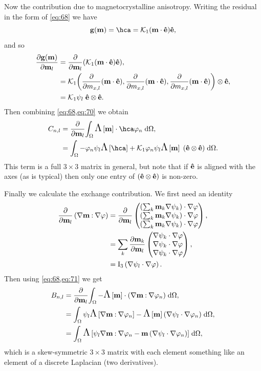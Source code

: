 Now the contribution due to magnetocrystalline anisotropy.
Writing the residual in the form of \cref{eq:68} we have 
\begin{equation}
  \gv(\mv) = \hca = \kone (\mv \cdot \ev) \ev,  
\end{equation}
and so 
\begin{equation}
  \begin{aligned}
    \pd{\gv(\mv)}{\mv_l} &= \pd{}{\mv_l} \bigb{ \kone (\mv \cdot \ev) \ev}, \\
    &= \kone \bigb{ \pd{}{m_{x,l}} (\mv \cdot \ev), 
      \pd{}{m_{x,l}} (\mv \cdot \ev),
      \pd{}{m_{x,l}} (\mv \cdot \ev) }  \tensorprod \ev, \\
    &= \kone \sbf_l \; \ev  \tensorprod \ev.
    \label{eq:70}
  \end{aligned}
\end{equation}
Then combining \cref{eq:68,eq:70} we obtain
\begin{equation}
  \begin{aligned} 
    C_{n,l} &= \pd{}{\mv_l} \intd{ \skewm{\mv} \cdot \hca  \tbf_n}, \\
    &= \intd{ -\tbf_n \sbf_l\skewm{\hca} 
       + \kone \tbf_n \sbf_l \skewm{\mv} \; (\ev  \tensorprod \ev) }.
  \end{aligned}
\end{equation}
This term is a full $3\times3$ matrix in general, but note that if $\mathbf{\hat{e}}$ is aligned with the axes (as is typical) then only one entry of $(\mathbf{\hat{e}}  \otimes \mathbf{\hat{e}})$ is non-zero.

Finally we calculate the exchange contribution.
We first need an identity
\begin{equation}
  \begin{aligned}
    \pd{}{\mv_l} \left(\nabla \mv \compdot \nabla \tbf\right) 
    &= \pd{}{\mv_l} \threevecdup{\left( \sum_k \mv_k \grad \sbf_k \right) \cdot \grad \tbf}, \\
    &=  \sum_k \pd{\mv_k}{\mv_l} \threevecdup{\grad \sbf_k \cdot \grad \tbf}, \\
    &=  \Idm_3 \left(\nabla \sbf_l \cdot \nabla \tbf \right).
    \label{eq:71}
  \end{aligned}
\end{equation}
Then using \cref{eq:68,eq:71} we get
\begin{equation}
  \begin{aligned}
    B_{n,l} &=  \frac{\partial }{\partial \mathbf{m}_l} {\int_{\Omega} {- \text{\Large{$\Lambda$}}\left[ \mathbf{m} \right] \cdot (\nabla \mathbf{m} \mathbin{:} \nabla \varphi_n)} {\; \mathrm{{d}}} {\Omega}} ,\\
    &= {\int_{\Omega} { \psi_l \text{\Large{$\Lambda$}}\left[ \nabla \mathbf{m} \mathbin{:} \nabla \varphi_n \right]
       - \text{\Large{$\Lambda$}}\left[ \mathbf{m} \right] \left( \nabla \psi_l \cdot \nabla \varphi_n \right)} {\; \mathrm{{d}}} {\Omega}}, \\
     &= {\int_{\Omega} {\text{\Large{$\Lambda$}}\left[  \psi_l \nabla \mathbf{m} \mathbin{:} \nabla \varphi_n
       - \mathbf{m} \left( \nabla \psi_l \cdot \nabla \varphi_n \right) \right]} {\; \mathrm{{d}}} {\Omega}},
   \end{aligned}
 \end{equation}
which is a skew-symmetric $3\times 3$ matrix with each element something like an element of a  discrete Laplacian (\ie two derivatives). 

